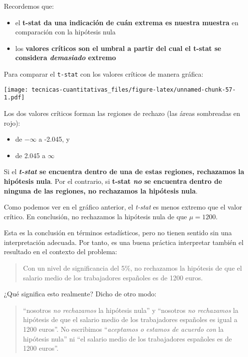 \documentclass[
]{book}
\providecommand{\tightlist}{%
  \setlength{\itemsep}{0pt}\setlength{\parskip}{0pt}}
\begin{document}
Recordemos que:

\begin{itemize}
\tightlist
\item
  el \textbf{t-stat da una indicación de cuán extrema es nuestra muestra} en comparación con la hipótesis nula
\item
  los \textbf{valores críticos son el umbral a partir del cual el t-stat se considera \emph{demasiado} extremo}
\end{itemize}

Para comparar el \texttt{t-stat} con los valores críticos de manera gráfica:

\texttt{[image: tecnicas-cuantitativas\_files/figure-latex/unnamed-chunk-57-1.pdf]}

Los dos valores críticos forman las regiones de rechazo (las áreas sombreadas en rojo):

\begin{itemize}
\tightlist
\item
  de \(-\infty\) a -2.045, y
\item
  de 2.045 a \(\infty\)
\end{itemize}

Si el \textbf{\emph{t-stat} se encuentra dentro de una de estas regiones, rechazamos la hipótesis nula}. Por el contrario, si \textbf{t-stat \emph{no} se encuentra dentro de ninguna de las regiones, no rechazamos la hipótesis nula}.

Como podemos ver en el gráfico anterior, el \emph{t-stat} es menos extremo que el valor crítico. En conclusión, no rechazamos la hipótesis nula de que \(\mu = 1200\).

Esta es la conclusión en términos estadísticos, pero no tienen sentido sin una interpretación adecuada. Por tanto, es una buena práctica interpretar también el resultado en el contexto del problema:

\begin{quote}
Con un nivel de significancia del 5\%, no rechazamos la hipótesis de que el salario medio de los trabajadores españoles es de 1200 euros.
\end{quote}

¿Qué significa esto realmente? Dicho de otro modo:

\begin{quote}
``nosotros \emph{no rechazamos} la hipótesis nula'' y ``nosotros \emph{no rechazamos} la hipótesis de que el salario medio de los trabajadores españoles es igual a 1200 euros''. No escribimos ``\emph{aceptamos o estamos de acuerdo con} la hipótesis nula'' ni ``el salario medio de los trabajadores españoles es de 1200 euros''.
\end{quote}
\end{document}
